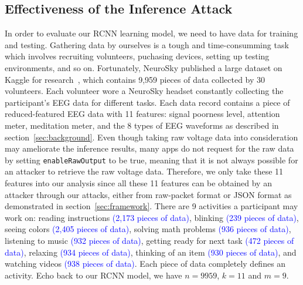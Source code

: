 \subsection{Effectiveness of the Inference Attack}
In order to evaluate our RCNN learning model, we need to have data for training and testing. Gathering data by ourselves is a tough and time-consumming task which involves recruiting volunteers, puchasing devices, setting up testing environments, and so on. Fortunately, NeuroSky published a large dataset on Kaggle for research~\cite{neuroskydata}, which contains 9,959 pieces of data collected by 30 volunteers. Each volunteer wore a NeuroSky headset constantly collecting the participant's EEG data for different tasks. Each data record contains a piece of reduced-featured EEG data with 11 features: signal poorness level, attention meter, meditation meter, and the 8 types of EEG waveforms as described in section~\ref{sec:background}. Even though taking raw voltage data into consideration may ameliorate the inference results, many apps do not request for the raw data by setting \texttt{enableRawOutput} to be true, meaning that it is not always possible for an attacker to retrieve the raw voltage data. Therefore, we only take these 11 features into our analysis since all these 11 features can be obtained by an attacker through our attacks, either from raw-packet format or JSON format as demonstrated in section~\ref{sec:framework}. There are 9 activities a participant may work on: reading instructions \textcolor{blue}{(2,173 pieces of data)}, blinking \textcolor{blue}{(239 pieces of data)}, seeing colors \textcolor{blue}{(2,405 pieces of data)}, solving math problems \textcolor{blue}{(936 pieces of data)}, listening to music \textcolor{blue}{(932 pieces of data)}, getting ready for next task \textcolor{blue}{(472 pieces of data)}, relaxing \textcolor{blue}{(934 pieces of data)}, thinking of an item \textcolor{blue}{(930 pieces of data)}, and watching videos \textcolor{blue}{(938 pieces of data)}. Each piece of data completely defines an activity. Echo back to our RCNN model, we have $n=9959$, $k=11$ and $m=9$.\\
%
